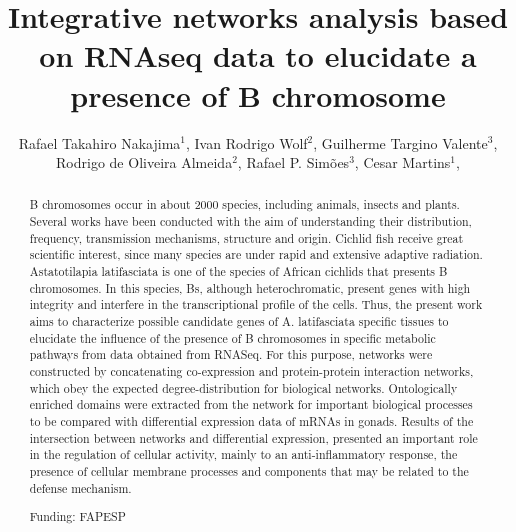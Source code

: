 \documentclass[twoside]{article}
\title{\vspace{-15mm}\fontsize{24pt}{10pt}\selectfont\textbf{ Integrative networks analysis based on RNAseq data to elucidate a presence of B chromosome }} %
\author{ Rafael Takahiro Nakajima$^{1}$, Ivan Rodrigo Wolf$^{2}$, Guilherme Targino Valente$^{3}$, Rodrigo de Oliveira Almeida$^{2}$, Rafael P. Simões$^{3}$, Cesar Martins$^{1}$, }
\affil{ 1 IBB-UNESP

2 FCA-UNESP

3 UNESP - State University of Sao Paulo

 }
\date{}
\begin{document}
  
  
  \maketitle %
  
  
  \thispagestyle{fancy} %
  
  
  \begin{abstract}
  B chromosomes occur in about 2000 species, including animals, insects and plants. Several works have been conducted with the aim of understanding their distribution, frequency, transmission mechanisms, structure and origin. Cichlid fish receive great scientific interest, since many species are under rapid and extensive adaptive radiation. Astatotilapia latifasciata is one of the species of African cichlids that presents B chromosomes. In this species, Bs, although heterochromatic, present genes with high integrity and interfere in the transcriptional profile of the cells. Thus, the present work aims to characterize possible candidate genes of A. latifasciata specific tissues to elucidate the influence of the presence of B chromosomes in specific metabolic pathways from data obtained from RNASeq. For this purpose, networks were constructed by concatenating co-expression and protein-protein interaction networks, which obey the expected degree-distribution for biological networks. Ontologically enriched domains were extracted from the network for important biological processes to be compared with differential expression data of mRNAs in gonads. Results of the intersection between networks and differential expression, presented an important role in the regulation of cellular activity, mainly to an anti-inflammatory response, the presence of cellular membrane processes and components that may be related to the defense mechanism.
  
  Funding: FAPESP \\ 
  \end{abstract}
  
\end{document}
